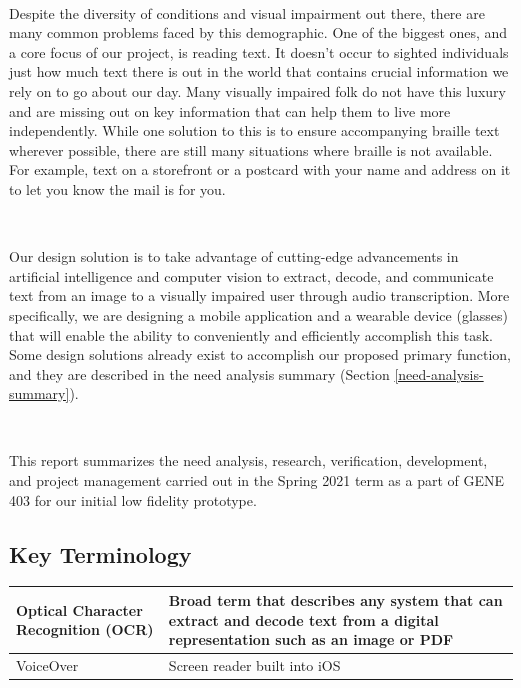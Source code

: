 \documentclass[a4paper,11pt]{article}
\begin{document}
\

\noindent
Despite the diversity of conditions and visual impairment out there, there are many common problems faced by this demographic. One of the biggest ones, and a core focus of our project, is reading text. It doesn't occur to sighted individuals just how much text there is out in the world that contains crucial information we rely on to go about our day. Many visually impaired folk do not have this luxury and are missing out on key information that can help them to live more independently. While one solution to this is to ensure accompanying braille text wherever possible, there are still many situations where braille is not available. For example, text on a storefront or a postcard with your name and address on it to let you know the mail is for you.

\

\noindent
Our design solution is to take advantage of cutting-edge advancements in artificial intelligence and computer vision to extract, decode, and communicate text from an image to a visually impaired user through audio transcription. More specifically, we are designing a mobile application and a wearable device (glasses) that will enable the ability to conveniently and efficiently accomplish this task. Some design solutions already exist to accomplish our proposed primary function, and they are described in the need analysis summary (Section \ref{need-analysis-summary}).

\

\noindent
This report summarizes the need analysis, research, verification, development, and project management carried out in the Spring 2021 term as a part of GENE 403 for our initial low fidelity prototype.

\subsection{Key Terminology}

\setlength{\tabcolsep}{1em}
\begin{table}[ht]
    \centering
    \begin{tabular}{|p{5cm}|p{10cm}|}
        \hline
        Optical Character Recognition (OCR) & Broad term that describes any system that can extract and decode text from a digital representation such as an image or PDF \\ \hline
        VoiceOver & Screen reader built into iOS \\ \hline
    \end{tabular}
\end{table}
\end{document}
